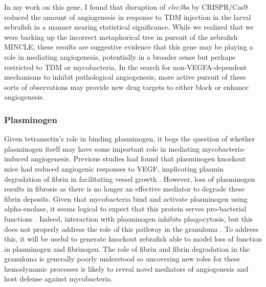 In my work on this gene, I found that disruption of \textit{clec3ba} by CRISPR/Cas9 reduced the amount of angiogenesis in response to TDM injection in the larval zebrafish in a manner nearing statistical significance. While we realized that we were barking up the incorrect metaphorical tree in pursuit of the zebrafish MINCLE, these results are suggestive evidence that this gene may be playing a role in mediating angiogenesis, potentially in a broader sense but perhaps restricted to TDM or mycobacteria. In the search for non\hyp{}VEGFA\hyp{}dependent mechanisms to inhibit pathological angiogenesis, more active pursuit of these sorts of observations may provide new drug targets to either block or enhance angiogenesis. 

\subsubsection{Plasminogen}\label{plg}

Given tetranectin's role in binding plasminogen, it begs the question of whether plasminogen itself may have some important role in mediating mycobacteria\hyp{}induced angiogenesis. Previous studies had found that plasminogen knockout mice had reduced angiogenic responses to VEGF, implicating plasmin degradation of fibrin in facilitating vessel growth \citep{Oh2003}. However, loss of plasminogen results in fibrosis as there is no longer an effective mediator to degrade these fibrin deposits. Given that mycobacteria bind and activate plasminogen using alpha\hyp{}enolase, it seems logical to expect that this protein serves pro\hyp{}bacterial functions \citep{Monroy2000}. Indeed, interaction with plasminogen inhibits phagocytosis, but this does not properly address the role of this pathway in the granuloma \citep{EcheverriaValencia2019}. To address this, it will be useful to generate knockout zebrafish able to model loss of function in plasminogen and fibrinogen. The role of fibrin and fibrin degradation in the granuloma is generally poorly understood so uncovering new roles for these hemodynamic processes is likely to reveal novel mediators of angiogenesis and host defense against mycobacteria.

